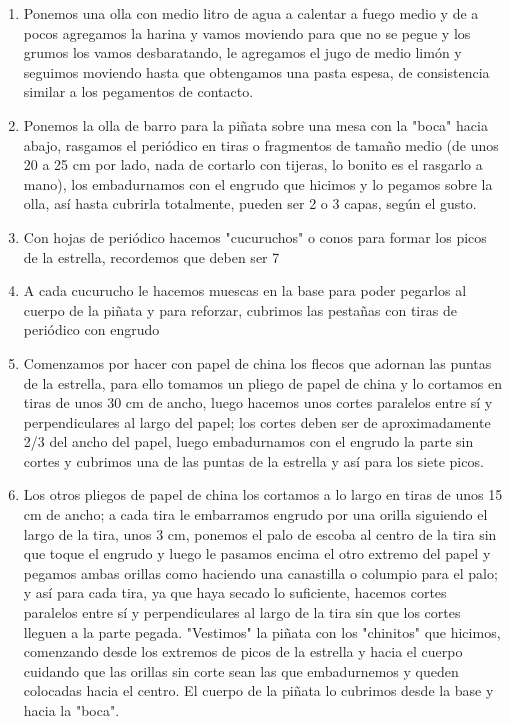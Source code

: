 \begin{enumerate}
\item Ponemos una olla con medio litro de agua a calentar a fuego medio y de a pocos agregamos la harina y vamos moviendo para que no se pegue y los grumos los vamos desbaratando, le agregamos el jugo de medio limón y seguimos moviendo hasta que obtengamos una pasta espesa, de consistencia similar a los pegamentos de contacto.
\item Ponemos la olla de barro para la piñata sobre una mesa con la "boca" hacia abajo, rasgamos el periódico en tiras o fragmentos de tamaño medio (de unos 20 a 25 cm por lado, nada de cortarlo con tijeras, lo bonito es el rasgarlo a mano), los embadurnamos con el engrudo que hicimos y lo pegamos sobre la olla, así hasta cubrirla totalmente, pueden ser 2 o 3 capas, según el gusto.
\item Con hojas de periódico hacemos "cucuruchos" o conos para formar los picos de la estrella, recordemos que deben ser 7
\item A cada cucurucho le hacemos muescas en la base para poder pegarlos al cuerpo de la piñata y para reforzar, cubrimos las pestañas con tiras de periódico con engrudo
\item Comenzamos por hacer con papel de china los flecos que adornan las puntas de la estrella, para ello tomamos un pliego de papel de china y lo cortamos en tiras de unos 30 cm de ancho, luego hacemos unos cortes paralelos entre sí y perpendiculares al largo del papel; los cortes deben ser de aproximadamente 2/3 del ancho del papel, luego embadurnamos con el engrudo la parte sin cortes y cubrimos una de las puntas de la estrella y así para los siete picos.
\item Los otros pliegos de papel de china los cortamos a lo largo en tiras de unos 15 cm de ancho; a cada tira le embarramos engrudo por una orilla siguiendo el largo de la tira, unos 3 cm, ponemos el palo de escoba al centro de la tira sin que toque el engrudo y luego le pasamos encima el otro extremo del papel y pegamos ambas orillas como haciendo una canastilla o columpio para el palo; y así para cada tira, ya que haya secado lo suficiente, hacemos cortes paralelos entre sí y perpendiculares al largo de la tira sin que los cortes lleguen a la parte pegada.
"Vestimos" la piñata con los "chinitos" que hicimos, comenzando desde los extremos de picos de la estrella y hacia el cuerpo cuidando que las orillas sin corte sean las que embadurnemos y queden colocadas hacia el centro. El cuerpo de la piñata lo cubrimos desde la base y hacia la "boca".
\end{enumerate}
